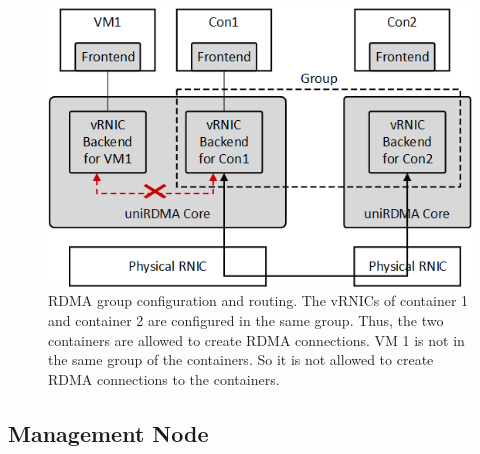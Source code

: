 

\begin{figure}[!ht]
	\centering
	\includegraphics[width=0.75\linewidth]{images/route-config}
	\caption{RDMA group configuration and routing. The vRNICs of container 1 and container 2 are configured in the same group. Thus, the two containers are allowed to create RDMA connections. VM 1 is not in the same group of the containers. So it is not allowed to create RDMA connections to the containers.}
	\label{fig:route-config}
\end{figure}


\subsection{Management Node}


